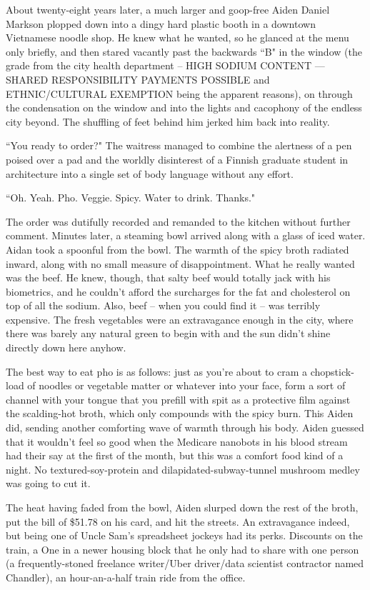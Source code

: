\documentclass[11pt]{book}
\begin{document}
	About twenty-eight years later, a much larger and goop-free Aiden Daniel Markson plopped down into a dingy hard plastic booth in a downtown Vietnamese noodle shop. He knew what he wanted, so he glanced at the menu only briefly, and then stared vacantly past the backwards  ``B" in the window (the grade from the city health department -- HIGH SODIUM CONTENT --- SHARED RESPONSIBILITY PAYMENTS POSSIBLE and ETHNIC/CULTURAL EXEMPTION being the apparent reasons), on through the condensation on the window and into the lights and cacophony of the endless city beyond. The shuffling of feet behind him jerked him back into reality.
	
	``You ready to order?" The waitress managed to combine the alertness of a pen poised over a pad and the worldly disinterest of a Finnish graduate student in architecture into a single set of body language without any effort.
	
	``Oh. Yeah. Pho. Veggie. Spicy. Water to drink. Thanks."
	
	The order was dutifully recorded and remanded to the kitchen without further comment. Minutes later, a steaming bowl arrived along with a glass of iced water. Aidan took a spoonful from the bowl. The warmth of the spicy broth radiated inward, along with no small measure of disappointment. What he really wanted was the beef. He knew, though, that salty beef would totally jack with his biometrics, and he couldn't afford the surcharges for the fat and cholesterol on top of all the sodium. Also, beef -- when you could find it -- was terribly expensive. The fresh vegetables were an extravagance enough in the city, where there was barely any natural green to begin with and the sun didn't shine directly down here anyhow. 
	
	The best way to eat pho is as follows: just as you're about to cram a chopstick-load of noodles or vegetable matter or whatever into your face, form a sort of channel with your tongue that you prefill with spit as a protective film against the scalding-hot broth, which only compounds with the spicy burn. This Aiden did, sending another comforting wave of warmth through his body. Aiden guessed that it wouldn't feel so good when the Medicare nanobots in his blood stream had their say at the first of the month, but this was a comfort food kind of a night. No textured-soy-protein and dilapidated-subway-tunnel mushroom medley was going to cut it.
	
	The heat having faded from the bowl, Aiden slurped down the rest of the broth, put the bill of \$51.78 on his card, and hit the streets. An extravagance indeed, but being one of Uncle Sam's spreadsheet jockeys had its perks. Discounts on the train, a One in a newer housing block that he only had to share with one person (a frequently-stoned freelance writer/Uber driver/data scientist contractor named Chandler), an hour-an-a-half train ride from the office.
	
\end{document}
